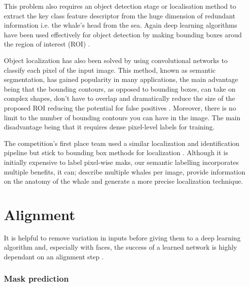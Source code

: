 \documentclass{IET}%
\begin{document}
This problem also requires an object detection stage or localisation method to extract the key class feature descriptor from the huge dimension of redundant information i.e. the whale's head from the sea. Again deep learning algorithms have been used effectively for object detection by making bounding boxes aroud the region of interest (ROI) \cite{girshick2015fast,girshick2014rich}. 

Object localization has also been solved by using convolutional networks to classify each pixel of the input image. This method, known as semantic segmentation, has gained popularity in many applications, the main advantage being that the bounding contours, as opposed to bounding boxes, can take on complex shapes, don't have to overlap and dramatically reduce the size of the proposed ROI reducing the potential for false positives \cite{sermanet2013overfeat}. Moreover, there is no limit to the number of bounding contours you can have in the image. The main disadvantage being that it requires dense pixel-level labels for training.

The competition's first place team used a similar localization and identification pipeline but stick to bounding box methods for localization \cite{w1st}. Although it is initially expensive to label pixel-wise maks, our semantic labelling incorporates multiple benefits, it can; describe multiple whales per image, provide information on the anatomy of the whale and generate a more precise localization technique.

\section{Alignment}

It is helpful to remove variation in inputs before giving them to a deep learning algorithm and, especially with faces, the success of a learned network is highly dependant on an alignment step \cite{lecun2012efficient,taigman2014deepface}. 

\subsubsection{Mask prediction}
\end{document}

